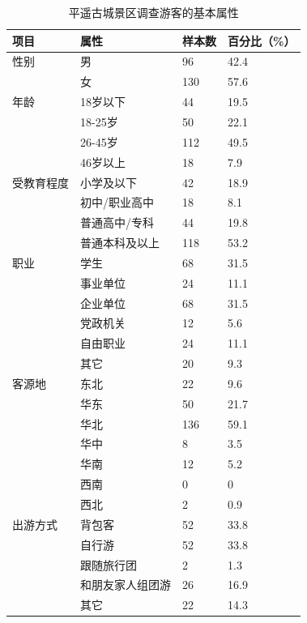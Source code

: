 \documentclass[UTF8]{ctexart}
\begin{document}
            \begin{table}[H]
            \centering
            \caption{平遥古城景区调查游客的基本属性}
            \begin{tabular}{p{2.5cm}p{3cm}p{2cm}p{2cm}}
                \toprule
                项目 & 属性 & 样本数 & 百分比（\%）\\ 
                \midrule
                性别&男 &96 & 42.4 \\
                & 女&130 &  57.6\\
                \cmidrule{1-4}
                年龄& 18岁以下& 44 &19.5  \\
                &18-25岁&50 & 22.1  \\
                &26-45岁&112 & 49.5  \\
                &46岁以上&18 &  7.9 \\
                \cmidrule{1-4}
                受教育程度& 小学及以下&42 &18.9 \\
                &初中/职业高中& 18&8.1   \\
                &普通高中/专科&44& 19.8 \\
                &普通本科及以上&118 & 53.2  \\
                \cmidrule{1-4}
                职业&学生&68&31.5\\
                &事业单位&24&11.1\\
                &企业单位&68&31.5\\
                &党政机关&12&5.6\\
                &自由职业&24&11.1\\
                &其它&20&9.3\\
                \cmidrule{1-4}
                客源地&东北&22&9.6\\
                &华东&50&21.7\\
                &华北&136&59.1\\
                &华中&8&3.5\\
                &华南&12&5.2\\
                &西南&0&0\\
                &西北&2&0.9\\
                \cmidrule{1-4}
                出游方式&背包客&52&33.8\\
                &自行游&52&33.8\\
                &跟随旅行团&2&1.3\\
                &和朋友家人组团游&26&16.9\\
                &其它&22&14.3\\
                \bottomrule
            \end{tabular}
            \end{table}
\end{document}
